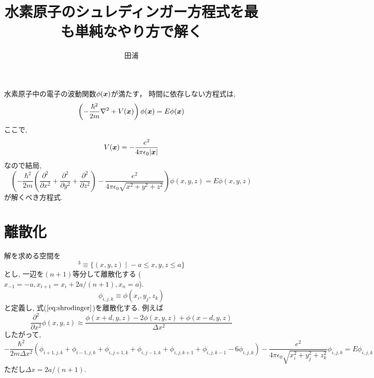 \documentclass[dvipdfmx]{article}
\title{水素原子のシュレディンガー方程式を最も単純なやり方で解く}
\author{田浦}
\date{}
\newcommand{\bvec}[1]{\mbox{\boldmath $#1$}}
\begin{document}
\maketitle

\section{}
水素原子中の電子の波動関数$\phi(\bvec{x})$が満たす，
時間に依存しない方程式は,
\begin{equation}
\left(- \frac{\hbar^2}{2m} \nabla^2 + V(\bvec{x})\right) \phi(\bvec{x}) 
= E \phi(\bvec{x})
\end{equation}
ここで, 
\begin{equation}
  V(\bvec{x}) = - \frac{e^2}{4\pi \epsilon_0 |\bvec{x}|}
\end{equation}
なので結局, 
\begin{equation}
\left(- \frac{\hbar^2}{2m} 
\left(\frac{\partial^2}{\partial x^2} + \frac{\partial^2}{\partial y^2} + \frac{\partial^2}{\partial z^2} \right)
- \frac{e^2}{4\pi \epsilon_0 \sqrt{x^2 + y^2 + z^2}}\right)
\phi(x, y, z) = E \phi(x, y, z)
\label{eq:shrodinger}
\end{equation}
が解くべき方程式. 

\section{離散化}
解を求める空間を
\begin{equation}
[-a,a]^3 \equiv \{ (x,y,z) \;|\; -a \leq x, y, z \leq a \}
\end{equation}
とし, 一辺を$(n+1)$等分して離散化する
($x_{-1} = -a, x_{i+1} = x_i + 2a/(n+1), x_n = a$).
\begin{equation}
\phi_{i,j,k} \equiv \phi(x_i, y_j, z_k)
\end{equation}
と定義し, 式($\ref{eq:shrodinger}$)を離散化する. 例えば
\begin{equation}
\frac{\partial^2}{\partial x^2} \phi(x, y, z)
\approx
\frac{\phi(x + d, y, z) - 2\phi(x, y, z) + \phi(x - d, y, z)}{\Delta x^2}
\end{equation}
したがって, 
\begin{equation}
- \frac{\hbar^2}{2m \Delta x^2} 
\left(
  \phi_{i+1,j,k} + \phi_{i-1,j,k} 
+ \phi_{i,j+1,k} + \phi_{i,j-1,k} 
+ \phi_{i,j,k+1} + \phi_{i,j,k-1} 
- 6 \phi_{i,j,k}
\right)
- \frac{e^2}{4\pi \epsilon_0 \sqrt{x_i^2 + y_j^2 + z_k^2}}
\phi_{i,j,k}
= E \phi_{i,j,k}
\end{equation}
ただし$\Delta x = 2a/(n+1)$.
\end{document}

